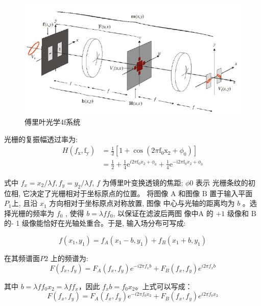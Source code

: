 \documentclass{buaaemp}
\begin{document}
\begin{figure}
    \centering
    \includegraphics[width=\linewidth]{image/fourier.jpg}
    \caption{傅里叶光学4f系统}
    \label{fig:my_label4}
\end{figure}
光栅的复振幅透过率为:
\begin{align*}
    H (f_{\mathrm{x}}, \mathrm{f_y})&=\frac{1}{2}[1+\cos (2 \pi \mathrm{f}_0 \mathrm{x}_2+\phi_0)] \\
    & =\frac{1}{2}+\frac{1}{4} \mathrm{e}^{i 2 \pi \mathrm{f}_0 x_2+\phi_0}+\frac{1}{4}\mathrm{e}^{-\mathrm{i} 2 \pi \mathrm{f}_0 x_2+\phi_0} 
\end{align*}
    
\newpage

式中 $ f_{x}=x_{2} / \lambda f, f_{y}=y_{2} / \lambda f $, $ f$  为傅里叶变换透镜的焦距;  $\phi 0 $ 表示
光栅条纹的初位相, 它决定了光栅相对于坐标原点的位置。
将图像  $\mathrm{A}$  和图像 $ \mathrm{B} $ 置于输入平面 $ P_1  $上, 且沿  $x_1 $ 方向相对于坐标原点对称放置, 图像
中心与光轴的距离均为  $b $ 。选择光栅的频率为 $ f_0$ , 使得 $ b=\lambda f f_{0} $, 以保证在滤波后两图
像中A 的 $ +1$  级像和 $ \mathrm{B}$  的- 1 级像能恰好在光轴处重合。于是, 输入场分布可写成:

\begin{equation}
    f\left(x_{1}, y_{1}\right)=f_{A}\left(x_{1}-b, y_{1}\right)+f_{B}\left(x_{1}+b, y_{1}\right)
\end{equation}

在其频谱面$  P 2$  上的频谱为:
\begin{equation}
    F\left(f_{x}, f_{y}\right)=F_{A}\left(f_{x}, f_{y}\right) e^{-i 2 \pi f_{x} b}+F_{B}\left(f_{x}, f_{y}\right) e^{i 2 \pi f_{x} b}
\end{equation}

其中 $b=\lambda f f_{0} x_{2}=\lambda f f_x $，因此 $f_{x} b=f_{0} x_{2}$。上式可以写成：
\begin{equation}
    F\left(f_{x}, f_{y}\right)=F_{A}\left(f_{x}, f_{y}\right) e^{-i 2 \pi f_{0} x_{2}}+F_{B}\left(f_{x}, f_{y}\right) e^{i 2 \pi f_{0} x_{2}}
\end{equation}
\end{document}
